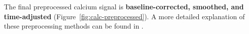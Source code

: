 \documentclass{report}
\begin{document}
    The final preprocessed calcium signal is \textbf{baseline-corrected, smoothed, and time-adjusted} (Figure~\ref{fig:calc-preprocessed}). A more detailed explanation of these preprocessing methods can be found in \cite[Section 3.3]{Sarwar2024}.  

\end{document}
